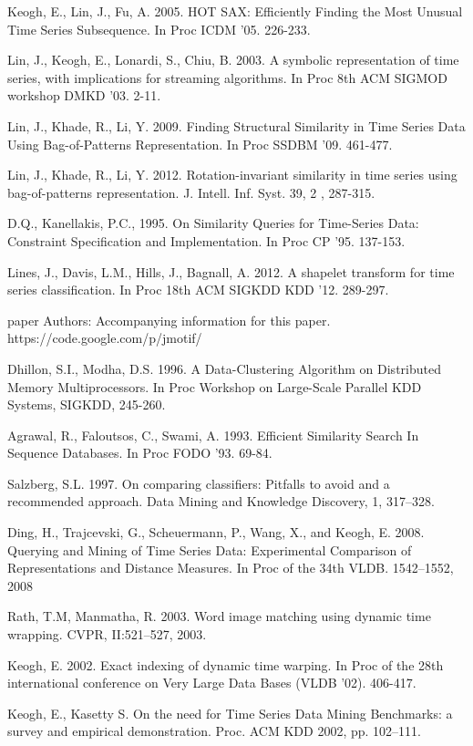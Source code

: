\documentclass{llncs}
\begin{document}
\begin{thebibliography}{5}
Keogh, E., Lin, J., Fu, A. 2005.
HOT SAX: Efficiently Finding the Most Unusual Time Series Subsequence. 
In Proc ICDM '05. 226-233.

Lin, J., Keogh, E., Lonardi, S., Chiu, B. 2003.
A symbolic representation of time series, with implications for streaming algorithms. 
In Proc 8th ACM SIGMOD workshop DMKD '03. 2-11.

Lin, J., Khade, R., Li, Y. 2009.
Finding Structural Similarity in Time Series Data Using Bag-of-Patterns Representation. 
In Proc SSDBM '09. 461-477.

Lin, J., Khade, R., Li, Y. 2012.
Rotation-invariant similarity in time series using bag-of-patterns representation. 
J. Intell. Inf. Syst. 39, 2 , 287-315.

D.Q., Kanellakis, P.C., 1995.
On Similarity Queries for Time-Series Data: Constraint Specification and Implementation. 
In Proc CP '95. 137-153.

Lines, J., Davis, L.M., Hills, J., Bagnall, A. 2012.
A shapelet transform for time series classification. 
In Proc 18th ACM SIGKDD KDD '12. 289-297.

paper Authors: 
Accompanying information for this paper. 
https://code.google.com/p/jmotif/

Dhillon, S.I., Modha, D.S. 1996.
A Data-Clustering Algorithm on Distributed Memory Multiprocessors. 
In Proc Workshop on Large-Scale Parallel KDD Systems, SIGKDD, 245-260.

Agrawal, R., Faloutsos, C., Swami, A. 1993.
Efficient Similarity Search In Sequence Databases.
In Proc FODO '93. 69-84.

Salzberg, S.L. 1997.
On comparing classifiers: Pitfalls to avoid and a recommended approach. 
Data Mining and Knowledge Discovery, 1, 317–328.

Ding, H., Trajcevski, G., Scheuermann, P., Wang, X., and Keogh, E. 2008.
Querying and Mining of Time Series Data: Experimental Comparison of Representations and Distance
Measures. 
In Proc of the 34th VLDB. 1542–1552, 2008

Rath, T.M, Manmatha, R. 2003.
Word image matching using dynamic time wrapping. 
CVPR, II:521–527, 2003.

Keogh, E. 2002. 
Exact indexing of dynamic time warping. 
In Proc of the 28th international conference on Very Large Data Bases (VLDB '02). 406-417.

Keogh, E., Kasetty S. 
On the need for Time Series Data Mining Benchmarks: a survey and empirical demonstration.
Proc. ACM KDD 2002, pp. 102–111.

\end{thebibliography}

%
\end{document}
